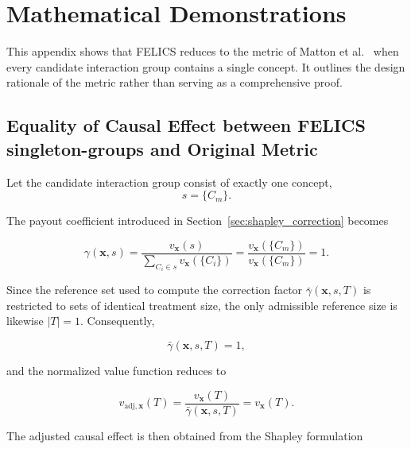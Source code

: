 \chapter{Mathematical Demonstrations}
\label{app:mathematical_demonstrations}
This appendix shows that FELICS reduces to the metric of Matton et al.~\cite{mattonWalkTalkMeasuring2024} when every candidate interaction group contains a single concept. It outlines the design rationale of the metric rather than serving as a comprehensive proof.

\section*{Equality of Causal Effect between FELICS singleton-groups and Original Metric}
\begin{math_box}[label=ma:one_item_group]
    Let the candidate interaction group consist of exactly one concept,
    \begin{equation}
        s=\{C_m\}.
    \end{equation}

    The payout coefficient introduced in Section~\ref{sec:shapley_correction} becomes

    \begin{equation}
        \gamma(\mathbf{x},s)
        =
        \frac{v_{\mathbf{x}}(s)}
        {\sum_{C_i\in s}v_{\mathbf{x}}(\{C_i\})}
        =
        \frac{v_{\mathbf{x}}(\{C_m\})}
        {v_{\mathbf{x}}(\{C_m\})}
        =1.
    \end{equation}

    Since the reference set used to compute the correction factor
    $\bar\gamma(\mathbf{x},s,T)$ is restricted to sets of identical treatment size,
    the only admissible reference size is likewise $|T|=1$. Consequently,

    \begin{equation}
        \bar\gamma(\mathbf{x},s,T)=1,
    \end{equation}

    and the normalized value function reduces to

    \begin{equation}
        v_{\mathrm{adj},\mathbf{x}}(T)
        =
        \frac{v_{\mathbf{x}}(T)}
        {\bar\gamma(\mathbf{x},s,T)}
        =
        v_{\mathbf{x}}(T).
    \end{equation}

    The adjusted causal effect is then obtained from the Shapley formulation


\end{math_box}
